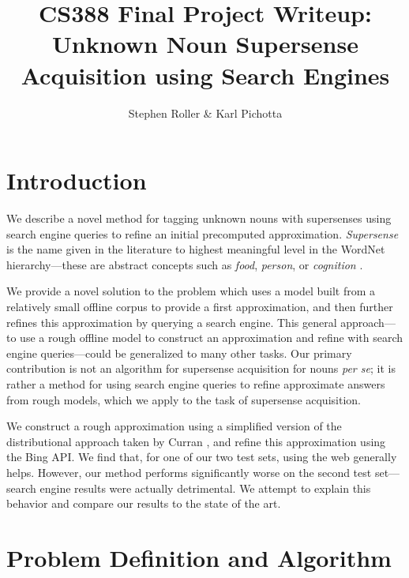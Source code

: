 \documentclass{article}
\title{CS388 Final Project Writeup:\\ 
Unknown Noun Supersense Acquisition using Search Engines}
\author{Stephen Roller \& Karl Pichotta}
\begin{document}
\maketitle




\section{Introduction}


We describe a novel method for tagging unknown nouns with supersenses using search engine queries to refine an initial precomputed approximation.
{\em Supersense} is the name given in the literature to highest meaningful level in the WordNet \cite{wordnet} hierarchy---these are abstract concepts such as {\it food}, {\it person}, or {\it cognition} \cite{cj}.

We provide a novel solution to the problem which uses a model built from a relatively small offline corpus to provide a first approximation, and then further refines this approximation by querying a search engine.
This general approach---to use a rough offline model to construct an approximation and refine with search engine queries---could be generalized to many other tasks.
Our primary contribution is not an algorithm for supersense acquisition for nouns {\it per se}; it is rather a method for using search engine queries to refine approximate answers from rough models, which we apply to the task of supersense acquisition.

We construct a rough approximation using a simplified version of the distributional approach taken by Curran \cite{curran}, and refine this approximation using the Bing API.
We find that, for one of our two test sets, using the web generally helps.
However, our method performs significantly worse on the second test set---search engine results were actually detrimental. 
We attempt to explain this behavior and compare our results to the state of the art.


\section{Problem Definition and Algorithm}
\end{document}
